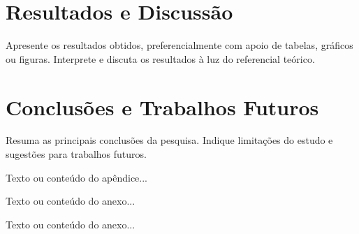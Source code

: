\documentclass[a4paper,12pt]{article}
\begin{document}
\section{Resultados e Discussão}
Apresente os resultados obtidos, preferencialmente com apoio de tabelas, gráficos ou figuras.
Interprete e discuta os resultados à luz do referencial teórico.

\section{Conclusões e Trabalhos Futuros}
Resuma as principais conclusões da pesquisa.
Indique limitações do estudo e sugestões para trabalhos futuros.



Texto ou conteúdo do apêndice...

Texto ou conteúdo do anexo...

Texto ou conteúdo do anexo...
\end{document}
